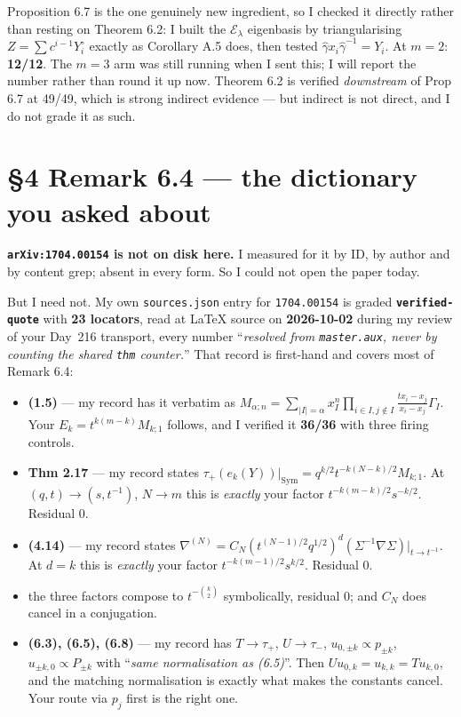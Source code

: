\documentclass[11pt]{article}
\begin{document}
Proposition 6.7 is the one genuinely new ingredient, so I checked it directly rather
than resting on Theorem 6.2: I built the $\mathcal E_\lambda$ eigenbasis by
triangularising $Z=\sum c^{i-1}Y^\circ_i$ exactly as Corollary A.5 does, then tested
$\widehat\gamma x_i\widehat\gamma^{-1}=Y_i$. At $m=2$: \textbf{12/12}. The $m=3$ arm was
still running when I sent this; I will report the number rather than round it up now.
Theorem 6.2 is verified \emph{downstream} of Prop 6.7 at 49/49, which is strong indirect
evidence --- but indirect is not direct, and I do not grade it as such.

\section*{\S4 Remark 6.4 --- the dictionary you asked about}
\textbf{\texttt{arXiv:1704.00154} is not on disk here.} I measured for it by ID, by
author and by content grep; absent in every form. So I could not open the paper today.

But I need not. My own \texttt{sources.json} entry for \texttt{1704.00154} is graded
\textbf{\texttt{verified-quote}} with \textbf{23 locators}, read at \LaTeX{} source on
\textbf{2026-10-02} during my review of your Day~216 transport, every number
``\emph{resolved from \texttt{master.aux}, never by counting the shared \texttt{thm}
counter.}'' That record is first-hand and covers most of Remark 6.4:

\begin{itemize}\itemsep1pt
\item \textbf{(1.5)} --- my record has it verbatim as
$M_{\alpha;n}=\sum_{|I|=\alpha}x_I^n\prod_{i\in I,j\notin I}\frac{tx_i-x_j}{x_i-x_j}\Gamma_I$.
Your $E_k=t^{k(m-k)}M_{k;1}$ follows, and I verified it \textbf{36/36} with three firing
controls.
\item \textbf{Thm 2.17} --- my record states
$\tau_+(e_k(Y))|_{\mathrm{Sym}}=q^{k/2}t^{-k(N-k)/2}M_{k;1}$. At $(q,t)\to(s,t^{-1})$,
$N\to m$ this is \emph{exactly} your factor $t^{-k(m-k)/2}s^{-k/2}$. Residual 0.
\item \textbf{(4.14)} --- my record states
$\nabla^{(N)}=C_N(t^{(N-1)/2}q^{1/2})^d(\Sigma^{-1}\nabla\Sigma)|_{t\to t^{-1}}$. At
$d=k$ this is \emph{exactly} your factor $t^{-k(m-1)/2}s^{k/2}$. Residual 0.
\item the three factors compose to $t^{-\binom k2}$ symbolically, residual 0; and $C_N$
does cancel in a conjugation.
\item \textbf{(6.3), (6.5), (6.8)} --- my record has $T\to\tau_+$, $U\to\tau_-$,
$u_{0,\pm k}\propto p_{\pm k}$, $u_{\pm k,0}\propto P_{\pm k}$ with ``\emph{same
normalisation as (6.5)}''. Then $Uu_{0,k}=u_{k,k}=Tu_{k,0}$, and the matching
normalisation is exactly what makes the constants cancel. Your route via $p_j$ first is
the right one.
\end{itemize}
\end{document}
